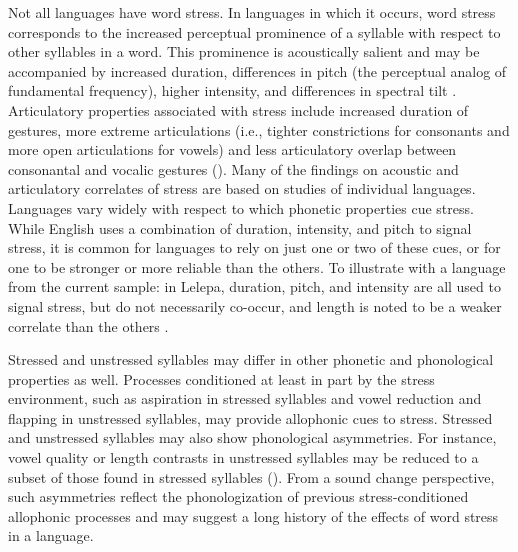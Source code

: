   Not all languages have word stress. In languages in which it occurs, word stress corresponds to the increased perceptual prominence of a syllable with respect to other syllables in a word. This prominence is acoustically salient and may be accompanied by increased duration, differences in pitch (the perceptual analog of fundamental frequency), higher intensity, and differences in spectral tilt \citep{Gordon2011}. Articulatory properties associated with stress include increased duration of gestures, more extreme articulations (i.e., tighter constrictions for consonants and more open articulations for vowels) and less articulatory overlap between consonantal and vocalic gestures (\citealt{BeckmanEdwards1994,Fougeron1999,DeJongEtAl1993}). Many of the findings on acoustic and articulatory correlates of stress are based on studies of individual languages. Languages vary widely with respect to which phonetic properties cue stress. While English uses a combination of duration, intensity, and pitch to signal stress, it is common for languages to rely on just one or two of these cues, or for one to be stronger or more reliable than the others. To illustrate with a language from the current sample: in Lelepa, duration, pitch, and intensity are all used to signal stress, but do not necessarily co-occur, and length is noted to be a weaker correlate than the others \citep[58]{Lacrampe2014}.

  Stressed and unstressed syllables may differ in other phonetic and phonological properties as well. Processes conditioned at least in part by the stress environment, such as aspiration in stressed syllables and vowel reduction and flapping in unstressed syllables, may provide allophonic cues to stress. Stressed and unstressed syllables may also show phonological asymmetries. For instance, vowel quality or length contrasts in unstressed syllables may be reduced to a subset of those found in stressed syllables (\citealt{vanderHulst2010}). From a sound change perspective, such asymmetries reflect the phonologization of previous stress-conditioned allophonic processes and may suggest a long history of the effects of word stress in a language.

